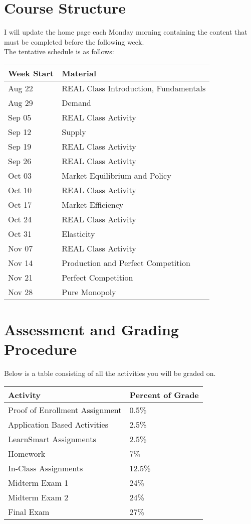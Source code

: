 \documentclass[11pt]{paper}
\begin{document}
\section{Course Structure}

I will update the home page each Monday morning containing the content that must be completed before the following week.\\

The tentative schedule is as follows:   

\begin{center}
\begin{tabular}{| l | l |}\hline
 Week Start & Material  \\\hline 
 Aug 22 & REAL Class Introduction, Fundamentals \\
 Aug 29 & Demand \\
 Sep 05 & REAL Class Activity\\
 Sep 12 & Supply\\
 Sep 19 & REAL Class Activity\\
 Sep 26 & REAL Class Activity\\
 Oct 03 & Market Equilibrium and Policy\\
 Oct 10 & REAL Class Activity\\
 Oct 17 & Market Efficiency\\
 Oct 24 & REAL Class Activity\\
 Oct 31 & Elasticity\\
 Nov 07 & REAL Class Activity\\
 Nov 14 & Production and Perfect Competition\\
 Nov 21 & Perfect Competition\\
 Nov 28 & Pure Monopoly\\\hline
\end{tabular}
\end{center}

\section{Assessment and Grading Procedure}

Below is a table consisting of all the activities you will be graded on. 

\begin{flushleft}
\begin{tabular}{ l  l }\hline
Activity & Percent of Grade \\\hline
Proof of Enrollment Assignment &  0.5\% \\
Application Based Activities & 2.5\% \\
LearnSmart Assignments & 2.5\% \\
Homework & 7\% \\
In-Class Assignments & 12.5\% \\
Midterm Exam 1 & 24\% \\
Midterm Exam 2 & 24\% \\
Final Exam & 27\% \\\hline
\end{tabular}
\end{flushleft}
\end{document}
